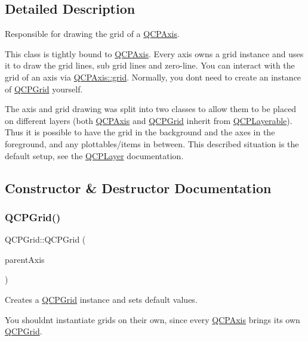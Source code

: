 \subsection{Detailed Description}
Responsible for drawing the grid of a \mbox{\hyperlink{class_q_c_p_axis}{Q\+C\+P\+Axis}}. 

This class is tightly bound to \mbox{\hyperlink{class_q_c_p_axis}{Q\+C\+P\+Axis}}. Every axis owns a grid instance and uses it to draw the grid lines, sub grid lines and zero-\/line. You can interact with the grid of an axis via \mbox{\hyperlink{class_q_c_p_axis_a63f1dd2df663680d2a8d06c19592dd63}{Q\+C\+P\+Axis\+::grid}}. Normally, you don\textquotesingle{}t need to create an instance of \mbox{\hyperlink{class_q_c_p_grid}{Q\+C\+P\+Grid}} yourself.

The axis and grid drawing was split into two classes to allow them to be placed on different layers (both \mbox{\hyperlink{class_q_c_p_axis}{Q\+C\+P\+Axis}} and \mbox{\hyperlink{class_q_c_p_grid}{Q\+C\+P\+Grid}} inherit from \mbox{\hyperlink{class_q_c_p_layerable}{Q\+C\+P\+Layerable}}). Thus it is possible to have the grid in the background and the axes in the foreground, and any plottables/items in between. This described situation is the default setup, see the \mbox{\hyperlink{class_q_c_p_layer}{Q\+C\+P\+Layer}} documentation. 

\subsection{Constructor \& Destructor Documentation}
\mbox{\label{class_q_c_p_grid_acd1cdd2909625388a13048b698494a17}} 
\subsubsection{\texorpdfstring{Q\+C\+P\+Grid()}{QCPGrid()}}
{\footnotesize\ttfamily Q\+C\+P\+Grid\+::\+Q\+C\+P\+Grid (\begin{DoxyParamCaption}\item[{\mbox{\hyperlink{class_q_c_p_axis}{Q\+C\+P\+Axis}} $\ast$}]{parent\+Axis }\end{DoxyParamCaption})}

Creates a \mbox{\hyperlink{class_q_c_p_grid}{Q\+C\+P\+Grid}} instance and sets default values.

You shouldn\textquotesingle{}t instantiate grids on their own, since every \mbox{\hyperlink{class_q_c_p_axis}{Q\+C\+P\+Axis}} brings its own \mbox{\hyperlink{class_q_c_p_grid}{Q\+C\+P\+Grid}}. 

